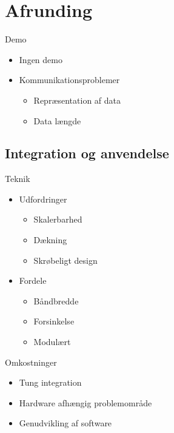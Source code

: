 \section{Afrunding}
\begin{frame}[fragile]{\insertsection}{Demo}
  \begin{itemize}
    \item Ingen demo
    \item Kommunikationsproblemer
    \begin{itemize}
      \item Repræsentation af data
      \item Data længde
    \end{itemize}
  \end{itemize}
\end{frame}

\subsection{Integration og anvendelse}
\begin{frame}[fragile]{\insertsubsection}{Teknik}
  \begin{itemize}
    \item Udfordringer
    \begin{itemize}
        \item Skalerbarhed
        \item Dækning
		\item Skrøbeligt design
    \end{itemize}
    \item Fordele
	\begin{itemize}
	  \item Båndbredde
	  \item Forsinkelse
	  \item Modulært
	\end{itemize}
  \end{itemize}
\end{frame}

\begin{frame}[fragile]{\insertsubsection}{Omkostninger}
  \begin{itemize}
    \item Tung integration
    \item Hardware afhængig problemområde
	\item Genudvikling af software
  \end{itemize}
\end{frame}

